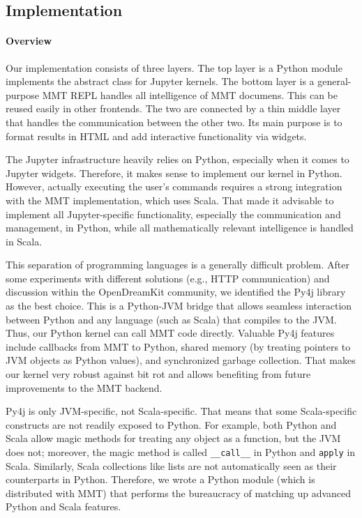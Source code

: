 \subsection{Implementation}\label{sec:kernel:impl}

\paragraph{Overview}
Our implementation consists of three layers.
The top layer is a Python module implements the abstract class for Jupyter kernels.
The bottom layer is a general-purpose MMT REPL handles all intelligence of MMT documens.
This can be reused easily in other frontends.
The two are connected by a thin middle layer that handles the communication between the other two.
Its main purpose is to format results in HTML and add interactive functionality via widgets.

The Jupyter infrastructure heavily relies on Python, especially when it comes to Jupyter widgets.
Therefore, it makes sense to implement our kernel in Python.
However, actually executing the user's commands requires a strong integration with the MMT implementation, which uses Scala.
That made it advisable to implement all Jupyter-specific functionality, especially the communication and management, in Python, while all mathematically relevant intelligence is handled in Scala.

This separation of programming languages is a generally difficult problem.
After some experiments with different solutions (e.g., HTTP communication) and discussion within the OpenDreamKit community, we identified the Py4j library as the best choice.
This is a Python-JVM bridge that allows seamless interaction between Python and any language (such as Scala) that compiles to the JVM.
Thus, our Python kernel can call MMT code directly.
Valuable Py4j features include callbacks from MMT to Python, shared memory (by treating pointers to JVM objects as Python values), and synchronized garbage collection.
That makes our kernel very robust against bit rot and allows benefiting from future improvements to the MMT backend.

Py4j is only JVM-specific, not Scala-specific.
That means that some Scala-specific constructs are not readily exposed to Python.
For example, both Python and Scala allow magic methods for treating any object as a function, but the JVM does not; moreover, the magic method is called \texttt{\_\_call\_\_} in Python and \texttt{apply} in Scala.
Similarly, Scala collections like lists are not automatically seen as their counterparts in Python.
Therefore, we wrote a Python module (which is distributed with MMT) that performs the bureaucracy of matching up advanced Python and Scala features.

